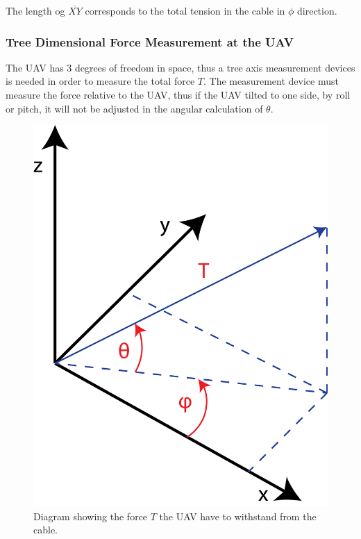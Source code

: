\noindent
The length og $\overline{XY}$ corresponds to the total tension in the cable in $\phi$ direction. 

\subsubsection{Tree Dimensional Force Measurement at the UAV}
The UAV has 3 degrees of freedom in space, thus a tree axis measurement devices is needed in order to measure the total force $T$.  The measurement device must measure the force relative to the UAV, thus if the UAV tilted to one side, by roll or pitch, it will not be adjusted in the angular calculation of $\theta$.  

\begin{figure}[hbtp]
\centering
\includegraphics[scale=0.5]{graphics/UAV-force-diagram.png}
\caption[Force diagram for UAV]{Diagram showing the force $T$ the UAV have to withstand from the cable.}
\end{figure}


